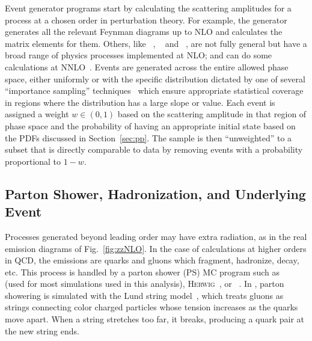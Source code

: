 Event generator programs start by calculating the scattering amplitudes for a process at a chosen order in perturbation theory.
For example, the generator {\MGAMC}~\cite{Alwall:2014hca} generates all the relevant Feynman diagrams up to NLO and calculates the matrix elements for them.
Others, like {\POWHEG}~\cite{Nason:2004rx,Frixione:2007vw,Alioli:2010xd}, {\SHERPA}~\cite{Gleisberg:2008ta} and {\MCFM}~\cite{Campbell:1999ah,Campbell:2011bn,Campbell:2015qma}, are not fully general but have a broad range of physics processes implemented at NLO\@; {\SHERPA} and {\MCFM} can do some calculations at NNLO~\cite{Boughezal:2016wmq}.
Events are generated across the entire allowed phase space, either uniformly or with the specific distribution dictated by one of several ``importance sampling'' techniques~\cite{Lepage:1977sw,Olive:2016xmw} which ensure appropriate statistical coverage in regions where the distribution has a large slope or value.
Each event is assigned a weight $w \in (0,1)$ based on the scattering amplitude in that region of phase space and the probability of having an appropriate initial state based on the PDFs discussed in Section~\ref{sec:pp}.
The sample is then ``unweighted'' to a subset that is directly comparable to data by removing events with a probability proportional to $1 - w$.


\subsection{Parton Shower, Hadronization, and Underlying Event}\label{sec:partonShower}

Processes generated beyond leading order may have extra radiation, as in the real emission diagrams of Fig.~\ref{fig:zzNLO}.
In the case of calculations at higher orders in QCD, the emissions are quarks and gluons which fragment, hadronize, decay, etc.
This process is handled by a parton shower (PS) MC program such as {\PYTHIA}~\cite{Sjostrand:2014zea} (used for most simulations used in this analysis), \textsc{Herwig}~\cite{Bahr:2008pv,Bellm:2015jjp}, or {\SHERPA}~\cite{Gleisberg:2008ta}.
In {\PYTHIA}, parton showering is simulated with the Lund string model~\cite{Andersson:1978vj,Andersson:1983jt, Andersson:2001yu,Olive:2016xmw}, which treats gluons as strings connecting color charged particles whose tension increases as the quarks move apart.
When a string stretches too far, it breaks, producing a quark pair at the new string ends.

